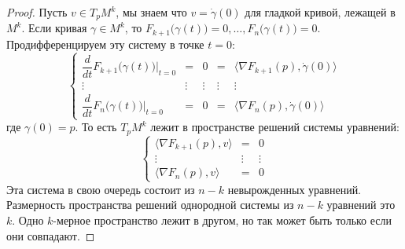 \documentclass[12pt]{article}
\theoremstyle{definition}
\begin{document}
\begin{proof}
	Пусть $v \in T_p M^k$, мы знаем что $v = \dot{\gamma}(0)$ для гладкой кривой, лежащей в $M^k$. Если кривая $\gamma \in M^k$, то $F_{k+1}\big(\gamma(t)\big) = 0, \dotsc, F_{n}\big(\gamma(t)\big) = 0$. Продифференцируем эту систему в точке $t = 0$:
	$$
		\left\{
			\begin{array}{ccccc}
				\dfrac{d}{dt} F_{k+1}\big(\gamma(t)\big)\bigg|_{t = 0} & =& 0 & = & \langle \nabla F_{k+1}(p),\dot{\gamma}(0) \rangle\\
				\vdots & \vdots & \vdots  & \vdots & \vdots \\
				\dfrac{d}{dt} F_{n}\big(\gamma(t)\big)\bigg|_{t = 0} &=& 0 & = & \langle \nabla F_{n}(p),\dot{\gamma}(0) \rangle
			\end{array}
		\right.
	$$
	где $\gamma(0) = p$. То есть $T_p M^k$ лежит в пространстве решений системы уравнений:
	$$
				\left\{
		\begin{array}{ccc}
			\langle \nabla F_{k+1}(p),v \rangle & =& 0\\
			\vdots & \vdots & \vdots \\
			\langle \nabla F_n(p),v \rangle &=& 0
		\end{array}
		\right.
	$$
	Эта система в свою очередь состоит из $n-k$ невырожденных уравнений. Размерность пространства решений однородной системы из $n-k$ уравнений это $k$. Одно $k$-мерное пространство лежит в другом, но так может быть только если они совпадают.
\end{proof}
\end{document}
